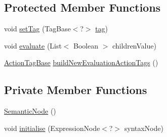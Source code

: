 \subsection*{Protected Member Functions}
\begin{DoxyCompactItemize}
\item 
void \hyperlink{classit_1_1emarolab_1_1cagg_1_1core_1_1evaluation_1_1semanticGrammar_1_1SemanticTree_1_1SemanticNode_a4c1354bca41f56e1697690a5ed567640}{set\-Tag} (Tag\-Base$<$?$>$ \hyperlink{classit_1_1emarolab_1_1cagg_1_1core_1_1evaluation_1_1semanticGrammar_1_1SemanticTree_1_1SemanticNode_a9bd291cd1cb604f9abb191441387b07b}{tag})
\item 
void \hyperlink{classit_1_1emarolab_1_1cagg_1_1core_1_1evaluation_1_1semanticGrammar_1_1SemanticTree_1_1SemanticNode_affb00dc956e52b7f04735c0a39a12429}{evaluate} (List$<$ Boolean $>$ children\-Value)
\item 
\hyperlink{classit_1_1emarolab_1_1cagg_1_1core_1_1evaluation_1_1semanticGrammar_1_1syntaxCompiler_1_1ActionTagBase}{Action\-Tag\-Base} \hyperlink{classit_1_1emarolab_1_1cagg_1_1core_1_1evaluation_1_1semanticGrammar_1_1SemanticTree_1_1SemanticNode_a4f65036b45fb6d41ff99deac272deed4}{build\-New\-Evaluation\-Action\-Tags} ()
\end{DoxyCompactItemize}
\subsection*{Private Member Functions}
\begin{DoxyCompactItemize}
\item 
\hyperlink{classit_1_1emarolab_1_1cagg_1_1core_1_1evaluation_1_1semanticGrammar_1_1SemanticTree_1_1SemanticNode_a87ef3f2b5b7e2acf522c79bd78dc4c7d}{Semantic\-Node} ()
\item 
void \hyperlink{classit_1_1emarolab_1_1cagg_1_1core_1_1evaluation_1_1semanticGrammar_1_1SemanticTree_1_1SemanticNode_a9ed0d8b89caea7b553c5c86632d99310}{initialise} (Expression\-Node$<$?$>$ syntax\-Node)
\end{DoxyCompactItemize}

